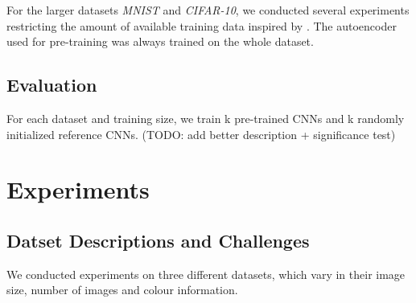 \documentclass{article}
\begin{document}
    For the larger datasets \emph{MNIST} and \emph{CIFAR-10}, we conducted several experiments restricting the amount of available training data inspired by \citep{masci2011stacked}. The autoencoder used for pre-training was always trained on the whole dataset. 


  \subsection{Evaluation}
    For each dataset and training size, we train k pre-trained CNNs and k randomly initialized reference CNNs.
    (TODO: add better description + significance test)
  

\section{Experiments}

  \subsection{Datset Descriptions and Challenges}
  We conducted experiments on three different datasets, which vary in their image size, number of images and colour information.
\end{document}
